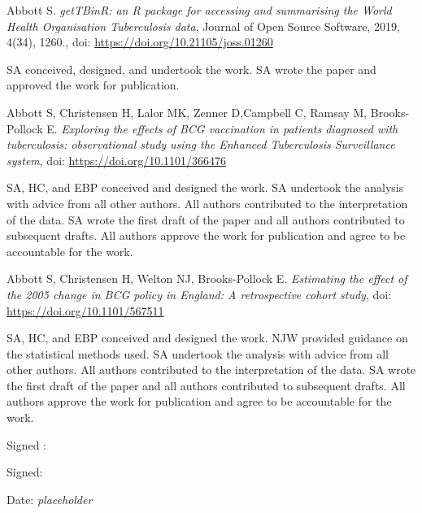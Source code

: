\documentclass[11pt,twoside]{bristolthesis}
\begin{document}
      \begin{contribution}
      Abbott S. \emph{getTBinR: an R package for accessing and summarising the World Health Organisation Tuberculosis data}, Journal of Open Source Software, 2019, 4(34), 1260., doi: \url{https://doi.org/10.21105/joss.01260}
      
      \par
      
      SA conceived, designed, and undertook the work. SA wrote the paper and approved the work for publication.
      
      \par
      
      Abbott S, Christensen H, Lalor MK, Zenner D,Campbell C, Ramsay M, Brooks-Pollock E. \emph{Exploring the effects of BCG vaccination in patients diagnosed with tuberculosis: observational study using the Enhanced Tuberculosis Surveillance system}, doi: \url{https://doi.org/10.1101/366476}
      
      \par
      
      SA, HC, and EBP conceived and designed the work. SA undertook the analysis with advice from all other authors. All authors contributed to the interpretation of the data. SA wrote the first draft of the paper and all authors contributed to subsequent drafts. All authors approve the work for publication and agree to be accountable for the work.
      
      \par
      
      Abbott S, Christensen H, Welton NJ, Brooks-Pollock E. \emph{Estimating the effect of the 2005 change in BCG policy in England: A retrospective cohort study}, doi: \url{https://doi.org/10.1101/567511}
      
      \par
      
      SA, HC, and EBP conceived and designed the work. NJW provided guidance on the statistical methods used. SA undertook the analysis with advice from all other authors. All authors contributed to the interpretation of the data. SA wrote the first draft of the paper and all authors contributed to subsequent drafts. All authors approve the work for publication and agree to be accountable for the work.
      
      \par
      
      Signed :
      
      \par
      
      Signed:
      
      \par
      
      Date: \emph{placeholder}
    \end{contribution}
\end{document}
